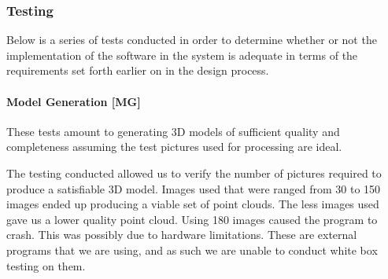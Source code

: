 \documentclass[10pt,letterpaper]{article}
\begin{document}
\subsubsection{Testing}
Below is a series of tests conducted in order to determine whether or not the implementation of the software in the system is adequate in terms of the requirements set forth earlier on in the design process.

\paragraph{Model Generation [MG]} These tests amount to generating 3D models of sufficient quality and completeness assuming the test pictures used for processing are ideal. 
\begin{table}[H]
  \caption{Model Generation Test Cases}
  
\end{table}
The testing conducted allowed us to verify the number of pictures required to produce a satisfiable 3D model. Images used that were ranged from 30 to 150 images ended up producing a viable set of point clouds. The less images used gave us a lower quality point cloud. Using 180 images caused the program to crash. This was possibly due to hardware limitations. These are external programs that we are using, and as such we are unable to conduct white box testing on them. 
\end{document}
